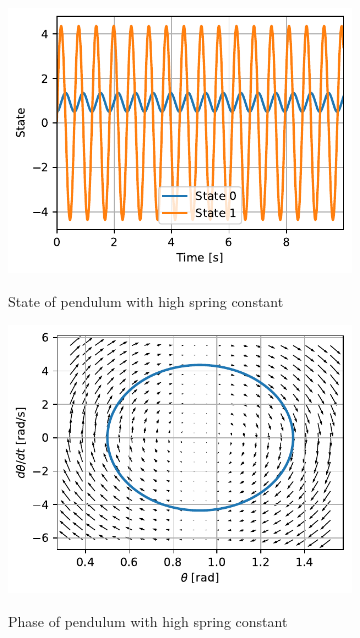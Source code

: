 \documentclass{cmc}
\begin{document}
\begin{figure}[H]
  \centering
  \begin{subfigure}[b]{0.49\textwidth}
    { \centering
      \includegraphics[width=\textwidth]{figures/State_Spring_Constant_2(x0_=_[0dot5,_0dot1]).pdf}
    }
    \caption{State of pendulum with high spring constant}
    \label{fig:state-pendulum-spring-constant-2}
  \end{subfigure}
  \begin{subfigure}[b]{0.49\textwidth}
    { \centering
      \includegraphics[width=\textwidth]{figures/Phase_Spring_Constant_2(x0_=_[0dot5,_0dot1]).pdf}
    }
    \caption{Phase of pendulum with high spring constant}
    \label{fig:phase-pendulum-spring-constant-2}
  \end{subfigure}
  \caption{}
  \label{fig:pendulum-spring-constant-2}
\end{figure}
\end{document}
